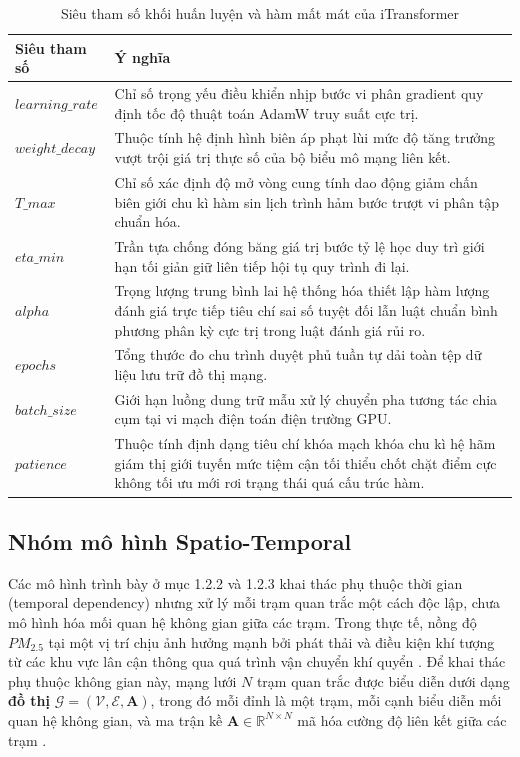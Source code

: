 \begin{table}[htbp]
\centering
\caption{Siêu tham số khối huấn luyện và hàm mất mát của iTransformer}
\label{tab:itrans_optim}
\renewcommand{\arraystretch}{1.3}
\begin{tabular}{p{3.8cm} p{10.5cm}}
\toprule
\textbf{Siêu tham số} & \textbf{Ý nghĩa} \\
\midrule
$learning\_rate$ & Chỉ số trọng yếu điều khiển nhịp bước vi phân gradient quy định tốc độ thuật toán AdamW truy suất cực trị. \\
$weight\_decay$ & Thuộc tính hệ định hình biên áp phạt lùi mức độ tăng trưởng vượt trội giá trị thực số của bộ biểu mô mạng liên kết. \\
$T\_max$ & Chỉ số xác định độ mở vòng cung tính dao động giảm chấn biên giới chu kì hàm sin lịch trình hảm bước trượt vi phân tập chuẩn hóa. \\
$eta\_min$ & Trần tựa chống đóng băng giá trị bước tỷ lệ học duy trì giới hạn tối giản giữ liên tiếp hội tụ quy trình đi lại. \\
$alpha$ & Trọng lượng trung bình lai hệ thống hóa thiết lập hàm lượng đánh giá trực tiếp tiêu chí sai số tuyệt đối lẫn luật chuẩn bình phương phân kỳ cực trị trong luật đánh giá rủi ro. \\
$epochs$ & Tổng thước đo chu trình duyệt phủ tuần tự dải toàn tệp dữ liệu lưu trữ đồ thị mạng. \\
$batch\_size$ & Giới hạn luồng dung trữ mẫu xử lý chuyển pha tương tác chia cụm tại vi mạch điện toán điện trường GPU. \\
$patience$ & Thuộc tính định dạng tiêu chí khóa mạch khóa chu kì hệ hãm giám thị giới tuyến mức tiệm cận tối thiểu chốt chặt điểm cực không tối ưu mới rơi trạng thái quá cấu trúc hàm. \\
\bottomrule
\end{tabular}
\end{table}

\subsection{Nhóm mô hình Spatio-Temporal}

Các mô hình trình bày ở mục 1.2.2 và 1.2.3 khai thác phụ thuộc thời gian (temporal dependency) nhưng xử lý mỗi trạm quan trắc một cách độc lập, chưa mô hình hóa mối quan hệ không gian giữa các trạm. Trong thực tế, nồng độ $PM_{2.5}$ tại một vị trí chịu ảnh hưởng mạnh bởi phát thải và điều kiện khí tượng từ các khu vực lân cận thông qua quá trình vận chuyển khí quyển \cite{dam2024pm25}. Để khai thác phụ thuộc không gian này, mạng lưới $N$ trạm quan trắc được biểu diễn dưới dạng \textbf{đồ thị} $\mathcal{G} = (\mathcal{V}, \mathcal{E}, \mathbf{A})$, trong đó mỗi đỉnh là một trạm, mỗi cạnh biểu diễn mối quan hệ không gian, và ma trận kề $\mathbf{A} \in \mathbb{R}^{N \times N}$ mã hóa cường độ liên kết giữa các trạm \cite{panja2025estgcn}.

